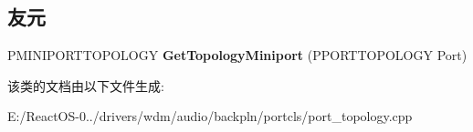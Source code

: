 \subsection*{友元}
\begin{DoxyCompactItemize}
\item 
\mbox{\label{class_c_port_topology_a7eb96fbf6e48a3c73dd4a3284d60b505}} 
P\+M\+I\+N\+I\+P\+O\+R\+T\+T\+O\+P\+O\+L\+O\+GY {\bfseries Get\+Topology\+Miniport} (P\+P\+O\+R\+T\+T\+O\+P\+O\+L\+O\+GY Port)
\end{DoxyCompactItemize}


该类的文档由以下文件生成\+:\begin{DoxyCompactItemize}
\item 
E\+:/\+React\+O\+S-\/0../drivers/wdm/audio/backpln/portcls/port\+\_\+topology.\+cpp\end{DoxyCompactItemize}
